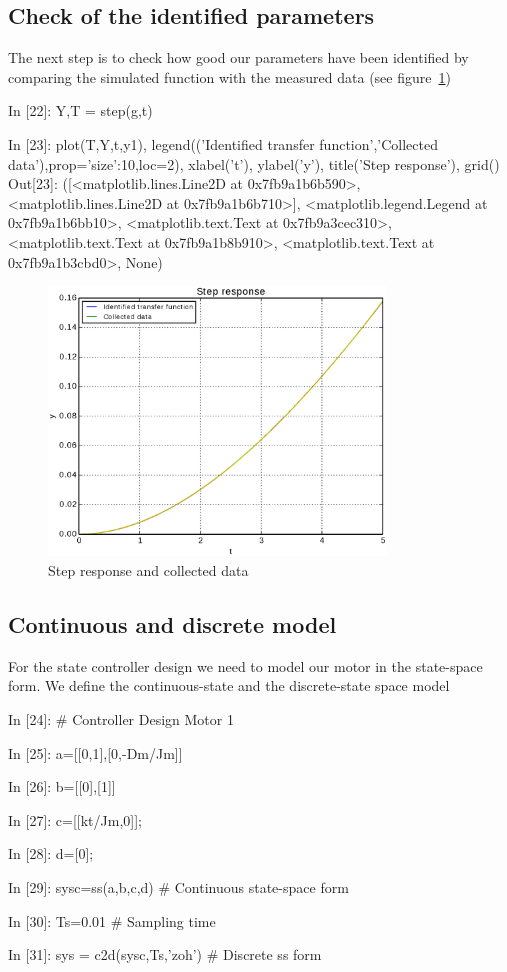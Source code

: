 \subsection{Check of the identified parameters}

The next step is to check how good our parameters have been identified by 
comparing the simulated function with the measured data (see figure~\ref{F15})

\begin{code}
In [22]: Y,T = step(g,t)

In [23]: plot(T,Y,t,y1), legend(('Identified transfer function','Collected 
data'),prop={'size':10},loc=2), xlabel('t'), ylabel('y'), title('Step 
response'), grid()
Out[23]: 
([<matplotlib.lines.Line2D at 0x7fb9a1b6b590>,
  <matplotlib.lines.Line2D at 0x7fb9a1b6b710>],
 <matplotlib.legend.Legend at 0x7fb9a1b6bb10>,
 <matplotlib.text.Text at 0x7fb9a3cec310>,
 <matplotlib.text.Text at 0x7fb9a1b8b910>,
 <matplotlib.text.Text at 0x7fb9a1b3cbd0>,
 None)
\end{code}

\begin{figure}[htbp]	%
\centering
\includegraphics[width=0.8\textwidth]{eps/motid.eps}
\caption{Step response and collected data}
\label{F15}
\end{figure}

\subsection{Continuous and discrete model}
For the state controller design we need to model our motor in the state-space 
form. We define the continuous-state and the discrete-state space model

\begin{code}
In [24]: # Controller Design Motor 1

In [25]: a=[[0,1],[0,-Dm/Jm]]

In [26]: b=[[0],[1]]

In [27]: c=[[kt/Jm,0]];

In [28]: d=[0];

In [29]: sysc=ss(a,b,c,d)                # Continuous state-space form

In [30]: Ts=0.01                         # Sampling time

In [31]: sys = c2d(sysc,Ts,'zoh')        # Discrete ss form
\end{code}

